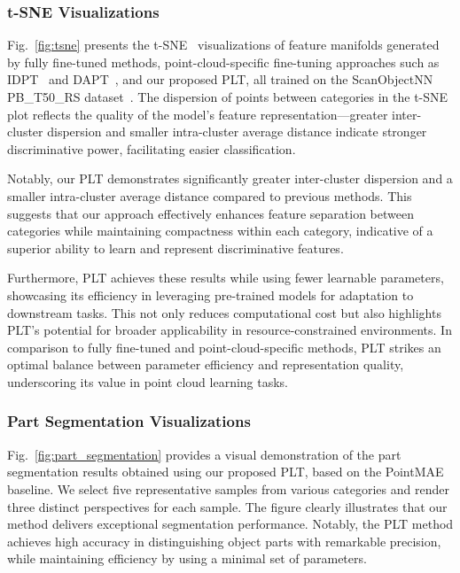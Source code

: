 \subsubsection{t-SNE Visualizations}  
Fig.~\ref{fig:tsne} presents the t-SNE~\cite{van2008visualizing} visualizations of feature manifolds generated by fully fine-tuned methods, point-cloud-specific fine-tuning approaches such as IDPT~\cite{zha2023instance} and DAPT~\cite{zhou2024dynamic}, and our proposed PLT, all trained on the ScanObjectNN PB\_T50\_RS dataset~\cite{uy2019revisiting}. The dispersion of points between categories in the t-SNE plot reflects the quality of the model's feature representation—greater inter-cluster dispersion and smaller intra-cluster average distance indicate stronger discriminative power, facilitating easier classification.

Notably, our PLT demonstrates significantly greater inter-cluster dispersion and a smaller intra-cluster average distance compared to previous methods. This suggests that our approach effectively enhances feature separation between categories while maintaining compactness within each category, indicative of a superior ability to learn and represent discriminative features.

Furthermore, PLT achieves these results while using fewer learnable parameters, showcasing its efficiency in leveraging pre-trained models for adaptation to downstream tasks. This not only reduces computational cost but also highlights PLT's potential for broader applicability in resource-constrained environments. In comparison to fully fine-tuned and point-cloud-specific methods, PLT strikes an optimal balance between parameter efficiency and representation quality, underscoring its value in point cloud learning tasks.



\subsubsection{Part Segmentation Visualizations}  
Fig.~\ref{fig:part_segmentation} provides a visual demonstration of the part segmentation results obtained using our proposed PLT, based on the PointMAE~\cite{pang2022masked} baseline. We select five representative samples from various categories and render three distinct perspectives for each sample. The figure clearly illustrates that our method delivers exceptional segmentation performance. Notably, the PLT method achieves high accuracy in distinguishing object parts with remarkable precision, while maintaining efficiency by using a minimal set of parameters.

